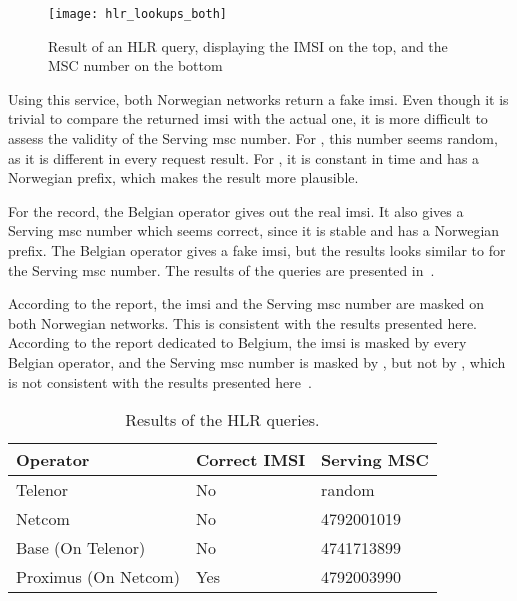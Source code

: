       \begin{figure}[h]
        \centering
        \texttt{[image: hlr\_lookups\_both]}
        \caption{Result of an HLR query, displaying the IMSI on the
        top, and the MSC number on the bottom~\cite{hlr_lookup}}
        \label{fig:hlr_lookup}
      \end{figure}
      
      Using this service, both Norwegian networks return a fake
      \gls{imsi}. Even though it is trivial to compare the returned
      \gls{imsi} with the actual one, it is more difficult to assess the
      validity of the Serving \gls{msc} number. For , this
      number seems random, as it is different in every request result.
      For , it is constant in time and has a Norwegian
      prefix, which makes the result more plausible. 
      
      For the record, the Belgian operator  gives out the
      real \gls{imsi}. It also gives a Serving \gls{msc} number which
      seems correct, since it is stable and has a Norwegian prefix. The
      Belgian operator  gives a fake \gls{imsi}, but the
      results looks similar to  for the Serving \gls{msc}
      number. The results of the queries are presented
      in~.

      According to the  report, the \gls{imsi} and the
      Serving \gls{msc} number are masked on both Norwegian networks.
      This is consistent with the results presented here. According to the
      report dedicated to Belgium, the \gls{imsi} is masked by every
      Belgian operator, and the Serving \gls{msc} number is masked by
      , but not by , which is not consistent
      with the results presented
      here~\cite{security_research_labs_mobile_2015-1}. 
      
      \begin{table}[h]
        \centering
        \begin{tabular}{@{}lll@{}}
          \toprule
          Operator             & Correct IMSI & Serving MSC\\
          \midrule
          Telenor              & No   & random     \\
          Netcom               & No   & 4792001019 \\
          Base (On Telenor)    & No   & 4741713899 \\            
          Proximus (On Netcom) & Yes  & 4792003990 \\
          \bottomrule
        \end{tabular}
        \caption{Results of the HLR queries.}
        \label{tab:hlr_queries}
      \end{table}
      
